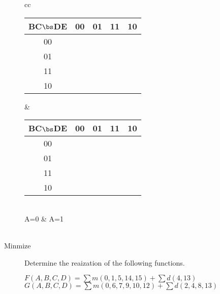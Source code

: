 \begin{description}
\begin{tabular}{cc}
	    \begin{tabular} {c||c|c|c|c}
	       BC$\bs$DE & 00 & 01 & 11 & 10 \\ \hline \hline
	       00        &    &    &    &    \\ \hline
	       01        &    &    &    &    \\ \hline
	       11        &    &    &    &    \\ \hline
	       10        &    &    &    &    \\
	    \end{tabular}		&
	    \begin{tabular} {c||c|c|c|c}
	       BC$\bs$DE & 00 & 01 & 11 & 10 \\ \hline \hline
	       00        &    &    &    &    \\ \hline
	       01        &    &    &    &    \\ \hline
	       11        &    &    &    &    \\ \hline
	       10        &    &    &    &    \\
	    \end{tabular}		\\
	A=0 & A=1 			\\ 
	 \vspace{0.2in}	\\
    \end{tabular}


\item[Minmize]  Determine the \SOPmin reaization of the following functions.

\begin{description}
\item[$F(A,B,C,D) = \sum m(0,1,5,14,15) + \sum d(4,13)$	]
\item[$G(A,B,C,D) = \sum m(0,6,7,9,10,12)+\sum d(2,4,8,13)$			]
\end{description}


\end{description}
